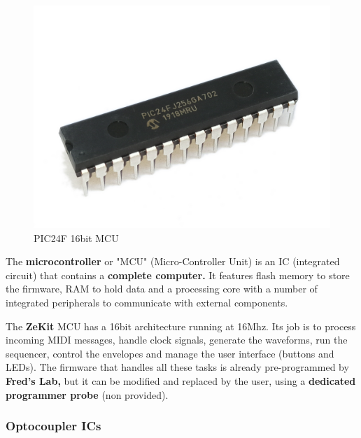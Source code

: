 \documentclass{scrartcl}
\begin{document}
\begin{figure}[!ht]
    \begin{center}
        \includegraphics[scale=0.08]{assets/zekit-mcu.jpg}
        \caption{PIC24F 16bit MCU}
    \end{center}
\end{figure}

The \textbf{microcontroller} or "MCU" (Micro-Controller Unit) is an IC (integrated circuit) that contains a \textbf{complete computer.} It features flash memory to store the firmware, RAM to hold data and a processing core with a number of integrated peripherals to communicate with external components.

The \textbf{ZeKit} MCU has a 16bit architecture running at 16Mhz. Its job is to process incoming MIDI messages, handle clock signals, generate the waveforms, run the sequencer, control the envelopes and manage the user interface (buttons and LEDs).
The firmware that handles all these tasks is already pre-programmed by \textbf{Fred’s Lab,} but it can be modified and replaced by the user, using a \textbf{dedicated programmer probe} (non provided).

\subsubsection{Optocoupler ICs}
\end{document}
